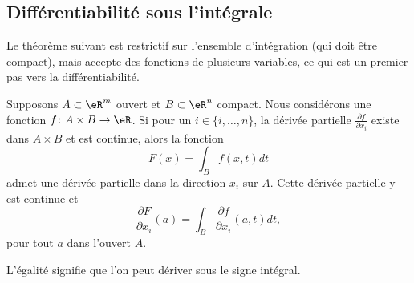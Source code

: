 \subsection{Différentiabilité sous l'intégrale}

Le théorème suivant est restrictif sur l'ensemble d'intégration (qui doit être compact), mais accepte des fonctions de plusieurs variables, ce qui est un premier pas vers la différentiabilité.
\begin{proposition}		\label{PropDerrSSIntegraleDSD}
    Supposons $A\subset\eR^m$ ouvert et $B\subset\eR^n$ compact. Nous considérons une fonction \( f\colon A\times B\to \eR\). Si pour un $i\in\{ i,\ldots,n \}$, la dérivée partielle $\frac{ \partial f }{ \partial x_i }$ existe dans $A\times B$ et est continue, alors la fonction
    \begin{equation}
        F(x)=\int_Bf(x,t)dt
    \end{equation}
    admet une dérivée partielle dans la direction \( x_i\) sur \( A\). Cette dérivée partielle y est continue et
    \begin{equation}
        \frac{ \partial F }{ \partial x_i }(a)=\int_B\frac{ \partial f }{ \partial x_i }(a,t)dt,
    \end{equation}
    pour tout \( a\) dans l'ouvert \( A\).
\end{proposition}
L'égalité signifie que l'on peut \og dériver sous le signe intégral\fg.

